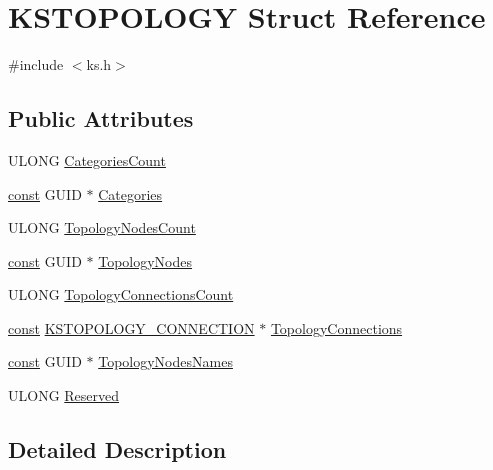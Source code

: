 \hypertarget{struct_k_s_t_o_p_o_l_o_g_y}{}\section{K\+S\+T\+O\+P\+O\+L\+O\+GY Struct Reference}
\label{struct_k_s_t_o_p_o_l_o_g_y}


{\ttfamily \#include $<$ks.\+h$>$}

\subsection*{Public Attributes}
\begin{DoxyCompactItemize}
\item 
U\+L\+O\+NG \hyperlink{struct_k_s_t_o_p_o_l_o_g_y_a43683fc683ee214878205240774f0ae8}{Categories\+Count}
\item 
\hyperlink{getopt1_8c_a2c212835823e3c54a8ab6d95c652660e}{const} G\+U\+ID $\ast$ \hyperlink{struct_k_s_t_o_p_o_l_o_g_y_a0105bf417c36888ea1b0862692054bba}{Categories}
\item 
U\+L\+O\+NG \hyperlink{struct_k_s_t_o_p_o_l_o_g_y_ac88044b4b2c511b80f071440c51841cd}{Topology\+Nodes\+Count}
\item 
\hyperlink{getopt1_8c_a2c212835823e3c54a8ab6d95c652660e}{const} G\+U\+ID $\ast$ \hyperlink{struct_k_s_t_o_p_o_l_o_g_y_a3c90a9be38eaa86612b5003da013e61b}{Topology\+Nodes}
\item 
U\+L\+O\+NG \hyperlink{struct_k_s_t_o_p_o_l_o_g_y_a2061a34f2c7d5477df0d498a51962896}{Topology\+Connections\+Count}
\item 
\hyperlink{getopt1_8c_a2c212835823e3c54a8ab6d95c652660e}{const} \hyperlink{struct_k_s_t_o_p_o_l_o_g_y___c_o_n_n_e_c_t_i_o_n}{K\+S\+T\+O\+P\+O\+L\+O\+G\+Y\+\_\+\+C\+O\+N\+N\+E\+C\+T\+I\+ON} $\ast$ \hyperlink{struct_k_s_t_o_p_o_l_o_g_y_ac946e2701875a2ebe861c29f9bd0c55f}{Topology\+Connections}
\item 
\hyperlink{getopt1_8c_a2c212835823e3c54a8ab6d95c652660e}{const} G\+U\+ID $\ast$ \hyperlink{struct_k_s_t_o_p_o_l_o_g_y_abc30ee7bd51b50bdefa11a475e4fb840}{Topology\+Nodes\+Names}
\item 
U\+L\+O\+NG \hyperlink{struct_k_s_t_o_p_o_l_o_g_y_a800a4e9385fc04d3a5554b6a523c16a3}{Reserved}
\end{DoxyCompactItemize}


\subsection{Detailed Description}


